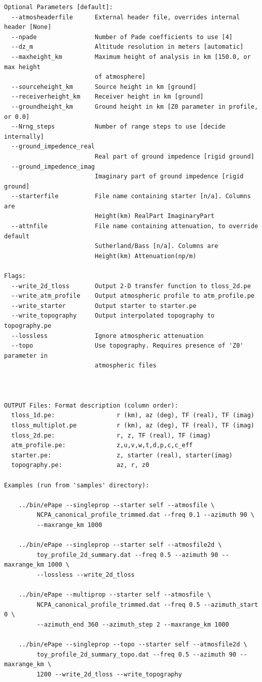 \begin{verbatim}
Optional Parameters [default]:
  --atmosheaderfile      External header file, overrides internal header [None]
  --npade                Number of Pade coefficients to use [4]
  --dz_m                 Altitude resolution in meters [automatic]
  --maxheight_km         Maximum height of analysis in km [150.0, or max height
                         of atmosphere]
  --sourceheight_km      Source height in km [ground]
  --receiverheight_km    Receiver height in km [ground]
  --groundheight_km      Ground height in km [Z0 parameter in profile, or 0.0]
  --Nrng_steps           Number of range steps to use [decide internally]
  --ground_impedence_real
                         Real part of ground impedence [rigid ground]
  --ground_impedence_imag
                         Imaginary part of ground impedence [rigid ground]
  --starterfile          File name containing starter [n/a]. Columns are
                         Height(km) RealPart ImaginaryPart
  --attnfile             File name containing attenuation, to override default
                         Sutherland/Bass [n/a]. Columns are
                         Height(km) Attenuation(np/m)

Flags:
  --write_2d_tloss       Output 2-D transfer function to tloss_2d.pe
  --write_atm_profile    Output atmospheric profile to atm_profile.pe
  --write_starter        Output starter to starter.pe
  --write_topography     Output interpolated topography to topography.pe
  --lossless             Ignore atmospheric attenuation
  --topo                 Use topography. Requires presence of 'Z0' parameter in
                         atmospheric files



OUTPUT Files: Format description (column order):
  tloss_1d.pe:                 r (km), az (deg), TF (real), TF (imag)
  tloss_multiplot.pe           r (km), az (deg), TF (real), TF (imag)
  tloss_2d.pe:                 r, z, TF (real), TF (imag)
  atm_profile.pe:              z,u,v,w,t,d,p,c,c_eff
  starter.pe:                  z, starter (real), starter(imag)
  topography.pe:               az, r, z0

Examples (run from 'samples' directory):

    ../bin/ePape --singleprop --starter self --atmosfile \
         NCPA_canonical_profile_trimmed.dat --freq 0.1 --azimuth 90 \
         --maxrange_km 1000

    ../bin/ePape --singleprop --starter self --atmosfile2d \
         toy_profile_2d_summary.dat --freq 0.5 --azimuth 90 --maxrange_km 1000 \
         --lossless --write_2d_tloss

    ../bin/ePape --multiprop --starter self --atmosfile \
         NCPA_canonical_profile_trimmed.dat --freq 0.5 --azimuth_start 0 \
         --azimuth_end 360 --azimuth_step 2 --maxrange_km 1000

    ../bin/ePape --singleprop --topo --starter self --atmosfile2d \
         toy_profile_2d_summary_topo.dat --freq 0.5 --azimuth 90 --maxrange_km \
         1200 --write_2d_tloss --write_topography

\end{verbatim}


